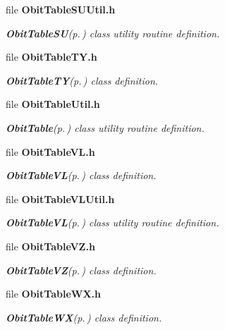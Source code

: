 \begin{CompactItemize}
\item 
file {\bf Obit\-Table\-SUUtil.h}
\begin{CompactList}\small\item\em {\bf Obit\-Table\-SU}{\rm (p.\,\pageref{structObitTableSU})} class utility routine definition. \item\end{CompactList}

\item 
file {\bf Obit\-Table\-TY.h}
\begin{CompactList}\small\item\em {\bf Obit\-Table\-TY}{\rm (p.\,\pageref{structObitTableTY})} class definition. \item\end{CompactList}

\item 
file {\bf Obit\-Table\-Util.h}
\begin{CompactList}\small\item\em {\bf Obit\-Table}{\rm (p.\,\pageref{structObitTable})} class utility routine definition. \item\end{CompactList}

\item 
file {\bf Obit\-Table\-VL.h}
\begin{CompactList}\small\item\em {\bf Obit\-Table\-VL}{\rm (p.\,\pageref{structObitTableVL})} class definition. \item\end{CompactList}

\item 
file {\bf Obit\-Table\-VLUtil.h}
\begin{CompactList}\small\item\em {\bf Obit\-Table\-VL}{\rm (p.\,\pageref{structObitTableVL})} class utility routine definition. \item\end{CompactList}

\item 
file {\bf Obit\-Table\-VZ.h}
\begin{CompactList}\small\item\em {\bf Obit\-Table\-VZ}{\rm (p.\,\pageref{structObitTableVZ})} class definition. \item\end{CompactList}

\item 
file {\bf Obit\-Table\-WX.h}
\begin{CompactList}\small\item\em {\bf Obit\-Table\-WX}{\rm (p.\,\pageref{structObitTableWX})} class definition. \item\end{CompactList}


\end{CompactItemize}
